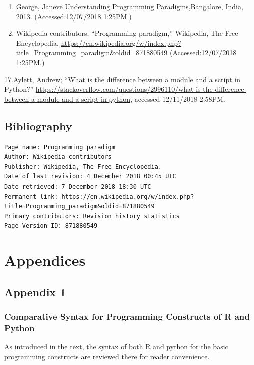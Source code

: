 \documentclass[]{book}
\theoremstyle{definition}
\theoremstyle{definition}
\theoremstyle{definition}
\theoremstyle{remark}
\begin{document}
\begin{enumerate}
\def\labelenumi{\arabic{enumi}.}
\setcounter{enumi}{14}
\item
  George, Janeve
  \href{http://www.janeve.me/software-programming/understanding-programming-paradigms}{Understanding
  Programming Paradigms},Bangalore, India, 2013. (Accessed:12/07/2018
  1:25PM.)
\item
  Wikipedia contributors, ``Programming paradigm,'' Wikipedia, The Free
  Encyclopedia,
  \url{https://en.wikipedia.org/w/index.php?title=Programming_paradigm\&oldid=871880549}
  (Accessed:12/07/2018 1:25PM.)
\end{enumerate}

17.Aylett, Andrew; ``What is the difference between a module and a
script in Python?''
\url{https://stackoverflow.com/questions/2996110/what-is-the-difference-between-a-module-and-a-script-in-python},
accessed 12/11/2018 2:58PM.

\chapter{Bibliography}\label{bibliography}

\begin{verbatim}
Page name: Programming paradigm
Author: Wikipedia contributors
Publisher: Wikipedia, The Free Encyclopedia.
Date of last revision: 4 December 2018 00:45 UTC
Date retrieved: 7 December 2018 18:30 UTC
Permanent link: https://en.wikipedia.org/w/index.php?title=Programming_paradigm&oldid=871880549
Primary contributors: Revision history statistics
Page Version ID: 871880549
\end{verbatim}

\part{Appendices}\label{part-appendices}

\chapter{Appendix 1}\label{appendix-1}

\section{Comparative Syntax for Programming Constructs of R and
Python}\label{comparative-syntax-for-programming-constructs-of-r-and-python}

As introduced in the text, the syntax of both R and python for the basic
programming constructs are reviewed there for reader convenience.
\end{document}
